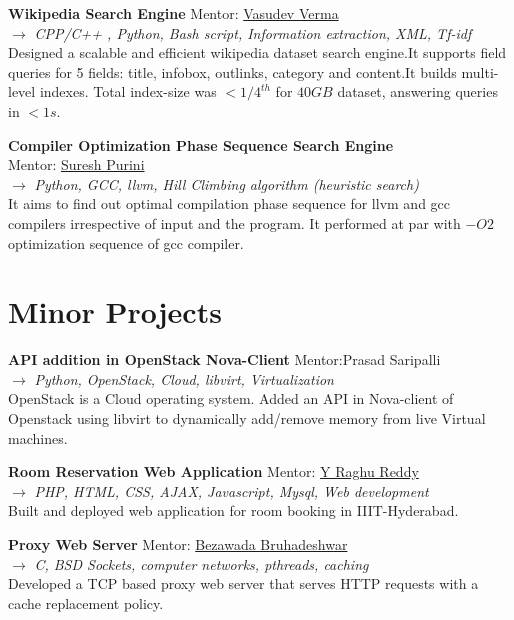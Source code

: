 \documentclass[margin]{res}
\begin{document}
\begin{resume}
{\bf Wikipedia Search Engine} \hfill{Mentor: \href{http://faculty.iiit.ac.in/~vv/Home.html}{Vasudev Verma}} \\
$\rightarrow$ {\it CPP/C++ , Python, Bash script, Information extraction, XML, Tf-idf } \\
Designed a scalable and efficient wikipedia dataset search engine.It supports field queries for 5 fields: title, infobox, outlinks, category and content.It builds multi-level indexes. Total index-size was $< 1/4^{th}$ for $40 GB$ dataset, answering queries in $ < 1s$. 

{\bf Compiler Optimization Phase Sequence Search Engine} \\
{ Mentor: \href{http://iiit.ac.in/people/faculty/psuresh}{Suresh Purini}} \\
$\rightarrow$ {\it Python, GCC, llvm, Hill Climbing algorithm (heuristic search) } \\
It aims to find out optimal compilation phase sequence for llvm and gcc compilers irrespective of input and the program. It performed at par with $-O2$ optimization sequence of gcc compiler.  



\section{Minor Projects}
{\bf API addition in OpenStack Nova-Client} \hfill{Mentor:Prasad Saripalli} \\
$\rightarrow$ {\it Python, OpenStack, Cloud,  libvirt, Virtualization } \\
OpenStack is a Cloud operating system. Added an API in Nova-client of Openstack using libvirt to dynamically add/remove memory from live Virtual machines.

{\bf Room Reservation Web Application} \hfill{Mentor: \href{http://faculty.iiit.ac.in/~raghu.reddy/Home.html}{Y Raghu Reddy}} \\ 
$\rightarrow$ {\it PHP, HTML, CSS, AJAX, Javascript, Mysql, Web development } \\
Built and deployed web application for room booking in IIIT-Hyderabad.

{\bf Proxy Web Server} \hfill{Mentor: \href{http://iiit.ac.in/people/faculty/bezawada}{Bezawada Bruhadeshwar}} \\ 
$\rightarrow$ {\it C, BSD Sockets, computer networks, pthreads, caching} \\
Developed a TCP based proxy web server that serves HTTP requests with a cache replacement policy.





\end{resume}
\end{document}
